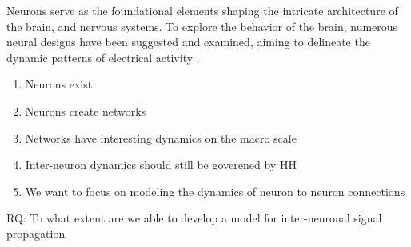 \documentclass[class={myRUCProject}, crop=false]{standalone}
\begin{document}


Neurons serve as the foundational elements shaping the intricate architecture of the brain, and nervous systems. To explore the behavior of the brain, numerous neural designs have been suggested and examined, aiming to delineate the dynamic patterns of electrical activity \cite{njitacke2020hidden}.




\begin{enumerate}
    \item Neurons exist
    \item Neurons  create networks
    \item Networks have interesting dynamics on the macro scale
    \item Inter-neuron dynamics should still be goverened by HH
    \item We want to focus on modeling the dynamics of neuron to neuron connections
\end{enumerate}

RQ: To what extent are we able to develop a model for inter-neuronal signal propagation
\end{document}
